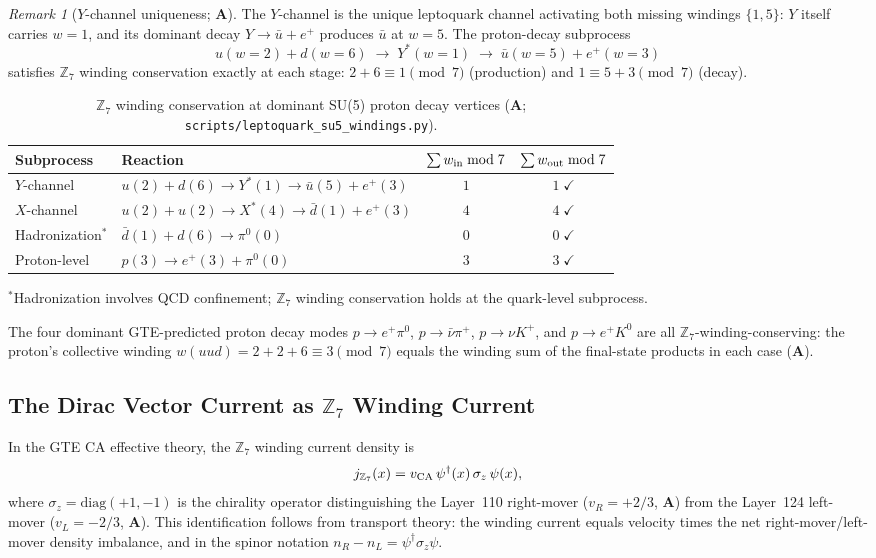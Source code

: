 \documentclass[11pt]{article}
\theoremstyle{remark}
\newtheorem{remark}[theorem]{Remark}
\newcommand{\CatA}{\textbf{A}}
\begin{document}
\begin{remark}[$Y$-channel uniqueness; \CatA]
\label{rem:y_channel_missing_windings}
The $Y$-channel is the unique leptoquark channel activating both missing windings
$\{1,5\}$: $Y$ itself carries $w=1$, and its dominant decay
$Y \to \bar{u} + e^+$
produces $\bar{u}$ at $w=5$.
The proton-decay subprocess
\[
  u(w{=}2) + d(w{=}6) \;\to\; Y^*(w{=}1) \;\to\; \bar{u}(w{=}5) + e^+(w{=}3)
\]
satisfies $\mathbb{Z}_7$ winding conservation exactly at each stage:
$2+6 \equiv 1 \pmod{7}$ (production) and $1 \equiv 5+3 \pmod{7}$ (decay).
\end{remark}

\begin{table}[h]
\centering
\small
\caption{$\mathbb{Z}_7$ winding conservation at dominant SU(5) proton decay vertices
  (\CatA; \texttt{scripts/leptoquark\_su5\_windings.py}).}
\label{tab:leptoquark_winding}
\begin{tabular}{llcc}
\hline
Subprocess & Reaction & $\sum w_{\rm in} \bmod 7$ & $\sum w_{\rm out} \bmod 7$ \\
\hline
$Y$-channel & $u(2)+d(6)\to Y^*(1)\to\bar{u}(5)+e^+(3)$ & $1$ & $1\;\checkmark$ \\
$X$-channel & $u(2)+u(2)\to X^*(4)\to\bar{d}(1)+e^+(3)$ & $4$ & $4\;\checkmark$ \\
Hadronization$^*$ & $\bar{d}(1)+d(6)\to\pi^0(0)$ & $0$ & $0\;\checkmark$ \\
Proton-level & $p(3)\to e^+(3)+\pi^0(0)$ & $3$ & $3\;\checkmark$ \\
\hline
\end{tabular}
\end{table}
{\footnotesize $^*$Hadronization involves QCD confinement;
$\mathbb{Z}_7$ winding conservation holds at the quark-level subprocess.}

The four dominant GTE-predicted proton decay modes
$p \to e^+\pi^0$, $p \to \bar\nu\pi^+$, $p \to \nu K^+$, and $p \to e^+K^0$
are all $\mathbb{Z}_7$-winding-conserving:
the proton's collective winding $w(uud) = 2+2+6 \equiv 3 \pmod{7}$
equals the winding sum of the final-state products in each case (\CatA).

\subsection{The Dirac Vector Current as \texorpdfstring{$\mathbb{Z}_7$}{Z7} Winding Current}
\label{sec:winding_current}

In the GTE CA effective theory, the $\mathbb{Z}_7$ winding current density is
\[
  j_{\mathbb{Z}_7}(x) = v_{\rm CA}\,\psi^\dagger(x)\,\sigma_z\,\psi(x),
\]
where $\sigma_z = \mathrm{diag}(+1,-1)$ is the chirality operator distinguishing
the Layer~110 right-mover ($v_R = +2/3$, $\CatA$) from the Layer~124 left-mover
($v_L = -2/3$, $\CatA$).
This identification follows from transport theory: the winding current equals velocity times the net right-mover/left-mover density imbalance, and in the spinor notation $n_R - n_L = \psi^\dagger\sigma_z\psi$.
\end{document}
